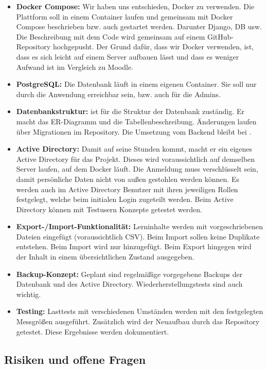 \begin{itemize}
  \item \textbf{Docker Compose:} Wir haben uns entschieden, Docker zu verwenden. Die Plattform soll in einem Container laufen und gemeinsam mit Docker Compose beschrieben bzw. auch gestartet werden. Darunter Django, DB usw. Die Beschreibung mit dem Code wird gemeinsam auf einem GitHub-Repository hochgepusht. Der Grund dafür, dass wir Docker verwenden, ist, dass es sich leicht auf einem Server aufbauen lässt und dass es weniger Aufwand ist im Vergleich zu Moodle.
  \item \textbf{PostgreSQL:} Die Datenbank läuft in einem eigenen Container. Sie soll nur durch die Anwendung erreichbar sein, bzw. auch für die Admins.
  \item \textbf{Datenbankstruktur:} \Jai ist für die Struktur der Datenbank zuständig. Er macht das ER-Diagramm und die Tabellenbeschreibung. Änderungen laufen über Migrationen im Repository. Die Umsetzung vom Backend bleibt bei \Luca.
  \item \textbf{Active Directory:} Damit \Jai auf seine Stunden kommt, macht er ein eigenes Active Directory für das Projekt. Dieses wird voraussichtlich auf demselben Server laufen, auf dem Docker läuft. Die Anmeldung muss verschlüsselt sein, damit persönliche Daten nicht von außen gestohlen werden können. Es werden auch im Active Directory Benutzer mit ihren jeweiligen Rollen festgelegt, welche beim initialen Login zugeteilt werden. Beim Active Directory können mit Testusern Konzepte getestet werden.
  \item \textbf{Export-/Import-Funktionalität:} Lerninhalte werden mit vorgeschriebenen Dateien eingefügt (voraussichtlich CSV). Beim Import sollen keine Duplikate entstehen. Beim Import wird nur hinzugefügt. Beim Export hingegen wird der Inhalt in einem übersichtlichen Zustand ausgegeben.
  \item \textbf{Backup-Konzept:} Geplant sind regelmäßige vorgegebene Backups der Datenbank und des Active Directory. Wiederherstellungstests sind auch wichtig.
  \item \textbf{Testing:} Lasttests mit verschiedenen Umständen werden mit den festgelegten Messgrößen ausgeführt. Zusätzlich wird der Neuaufbau durch das Repository getestet. Diese Ergebnisse werden dokumentiert.
\end{itemize}
 
\subsection{Risiken und offene Fragen}
 

